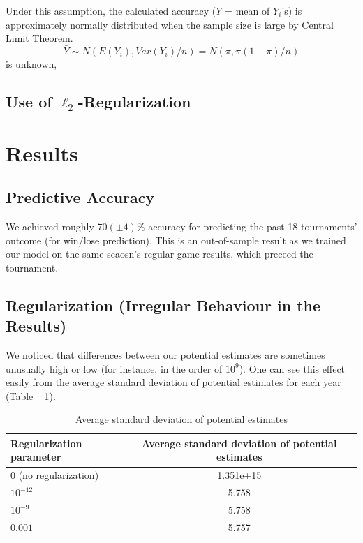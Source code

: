 \documentclass{article} %
\begin{document}
Under this assumption, the calculated accuracy ($\bar{Y}$ = mean of $Y_i$'s) is approximately normally distributed when the sample size is large by Central Limit Theorem.
\begin{equation}
    \bar{Y} \sim N(E(Y_i), Var(Y_i)/n) = N(\pi, \pi(1-\pi)/n)
\end{equation}
\pi is unknown, 


\newcommand\iid{i.i.d.}
\newcommand\pN{\mathcal{N}}



\subsection{Use of $\ell_2$-Regularization}\label{sec:l2}

\section{Results}
\subsection{Predictive Accuracy}
We achieved roughly $70(\pm4)\%$ accuracy for predicting the past 18 tournaments' outcome (for win/lose prediction).  This is an out-of-sample result as we trained our model on the same seaosn's regular game results, which preceed the tournament.
\subsection{Regularization (Irregular Behaviour in the Results)}
We noticed that differences between our potential estimates are sometimes unusually high or low (for instance, in the order of $10^9$).  One can see this effect easily from the average standard deviation of potential estimates for each year (Table ~ \ref{table:std}).

\begin{table}
\begin{center}
  \begin{tabular}{ | l | c | r | }
    \hline
    Regularization parameter & Average standard deviation of potential estimates \\ \hline
    0 (no regularization) & 1.351e+15 \\ \hline
    $10^{-12}$ & 5.758\\ \hline
    $10^{-9}$ & 5.758\\ \hline
    $0.001$ & 5.757\\
    \hline
  \end{tabular}
  \caption{Average standard deviation of potential estimates}
  \label{table:std}
\end{center}
\end{table}
\end{document}
